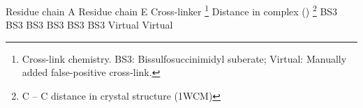 \startlocalfootnotes
\bTABLE
\bTABLEhead
\bTR
\bTD Residue chain A \eTD \bTD Residue chain E \eTD 
\bTD Cross-linker \footnote{Cross-link chemistry. BS3: Bissulfosuccinimidyl
suberate; Virtual: Manually added false-positive cross-link.} \eTD 
\bTD Distance in complex (\Angstrom) \footnote{C\low{\m{\beta}} -- C\low{\m{\beta}}
distance in crystal structure (1WCM)} \eTD
\eTR
\eTABLEhead
\bTABLEbody
\bTR
{} \eTD {} \eTD \bTD BS3 \eTD {} \eTD
\eTR
\bTR
{} \eTD {} \eTD \bTD BS3 \eTD {} \eTD
\eTR
\bTR
{} \eTD {} \eTD \bTD BS3 \eTD {} \eTD
\eTR
\bTR
{} \eTD {} \eTD \bTD BS3 \eTD {} \eTD
\eTR
\bTR
{} \eTD {} \eTD \bTD BS3 \eTD {} \eTD
\eTR
\bTR
{} \eTD {} \eTD \bTD BS3 \eTD {} \eTD
\eTR
\bTR
{} \eTD {} \eTD \bTD Virtual \eTD {} \eTD
\eTR
\bTR
{} \eTD {} \eTD \bTD Virtual \eTD {} \eTD
\eTR
\eTABLEbody
\eTABLE
\placelocalfootnotes
\stoplocalfootnotes
